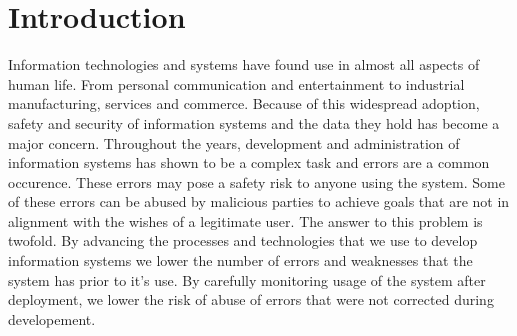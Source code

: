 

\chapter{Introduction}
Information technologies and systems have found use in almost all aspects of human life. From personal communication and entertainment to industrial manufacturing, services and commerce. Because of this widespread adoption, safety and security of information systems and the data they hold has become a major concern. Throughout the years, development and administration of information systems has shown to be a complex task and errors are a common occurence. These errors may pose a safety risk to anyone using the system. Some of these errors can be abused by malicious parties to achieve goals that are not in alignment with the wishes of a legitimate user. The answer to this problem is twofold. By advancing the processes and technologies that we use to develop information systems we lower the number of errors and weaknesses that the system has prior to it's use. By carefully monitoring usage of the system after deployment, we lower the risk of abuse of errors that were not corrected during developement.

